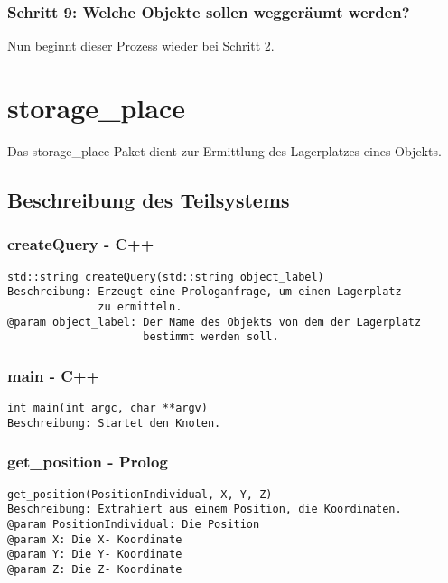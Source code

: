 \documentclass{suturo}
\begin{document}
\subsubsection{Schritt 9: Welche Objekte sollen weggeräumt werden?}
Nun beginnt dieser Prozess wieder bei Schritt 2.


\section{storage\_place}
Das storage\_place-Paket dient zur Ermittlung des Lagerplatzes eines Objekts.

\begin{figure}[!htb]
\end{figure}
      
\subsection{Beschreibung des Teilsystems}

\subsubsection{createQuery - C++}
\begin{verbatim}
std::string createQuery(std::string object_label)
Beschreibung: Erzeugt eine Prologanfrage, um einen Lagerplatz 
              zu ermitteln.
@param object_label: Der Name des Objekts von dem der Lagerplatz 
                     bestimmt werden soll.
\end{verbatim}\label{func:segmentplanes}

\subsubsection{main - C++}
\begin{verbatim}
int main(int argc, char **argv)
Beschreibung: Startet den Knoten.
\end{verbatim}\label{func:findcentergazebo}


\subsubsection{get\_position - Prolog}
\begin{verbatim}
get_position(PositionIndividual, X, Y, Z)
Beschreibung: Extrahiert aus einem Position, die Koordinaten.
@param PositionIndividual: Die Position
@param X: Die X- Koordinate
@param Y: Die Y- Koordinate
@param Z: Die Z- Koordinate
\end{verbatim}\label{func:findposes}
\end{document}
